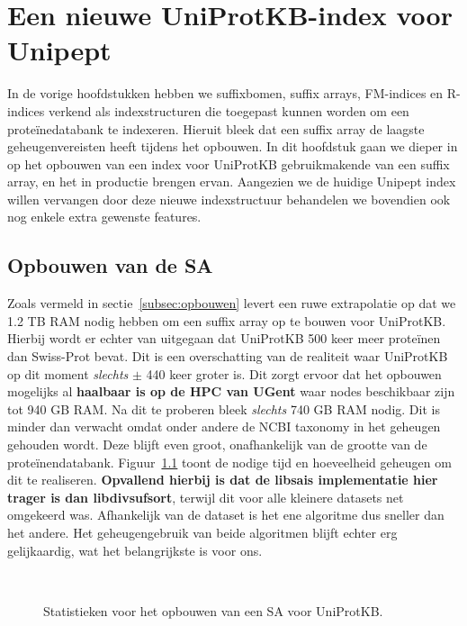 \chapter{Een nieuwe UniProtKB-index voor Unipept}\label{ch:een-nieuwe-uniprotkb-index-voor-unipept}
In de vorige hoofdstukken hebben we suffixbomen, suffix arrays, FM-indices en R-indices verkend als indexstructuren die toegepast kunnen worden om een proteïnedatabank te indexeren.
Hieruit bleek dat een suffix array de laagste geheugenvereisten heeft tijdens het opbouwen.
In dit hoofdstuk gaan we dieper in op het opbouwen van een index voor UniProtKB gebruikmakende van een suffix array, en het in productie brengen ervan.
Aangezien we de huidige Unipept index willen vervangen door deze nieuwe indexstructuur behandelen we bovendien ook nog enkele extra gewenste features.

\section{Opbouwen van de SA}\label{sec:opbouwen-van-de-sa}
Zoals vermeld in sectie~\ref{subsec:opbouwen} levert een ruwe extrapolatie op dat we 1.2 TB RAM nodig hebben om een suffix array op te bouwen voor UniProtKB\@.
Hierbij wordt er echter van uitgegaan dat UniProtKB 500 keer meer proteïnen dan Swiss-Prot bevat.
Dit is een overschatting van de realiteit waar UniProtKB op dit moment \textit{slechts} $\pm$ 440 keer groter is.
Dit zorgt ervoor dat het opbouwen mogelijks al \textbf{haalbaar is op de HPC van UGent} waar nodes beschikbaar zijn tot 940 GB RAM\@.
Na dit te proberen bleek \textit{slechts} 740 GB RAM nodig.
Dit is minder dan verwacht omdat onder andere de NCBI taxonomy in het geheugen gehouden wordt.
Deze blijft even groot, onafhankelijk van de grootte van de proteïnendatabank.
Figuur~\ref{fig:build_uniprot} toont de nodige tijd en hoeveelheid geheugen om dit te realiseren.
\textbf{Opvallend hierbij is dat de libsais implementatie hier trager is dan libdivsufsort}, terwijl dit voor alle kleinere datasets net omgekeerd was.
Afhankelijk van de dataset is het ene algoritme dus sneller dan het andere.
Het geheugengebruik van beide algoritmen blijft echter erg gelijkaardig, wat het belangrijkste is voor ons.
\\
\begin{figure}[H]
    \centering
    \\[4ex] %

    \caption{Statistieken voor het opbouwen van een SA voor UniProtKB.}\label{fig:build_uniprot}
\end{figure}

